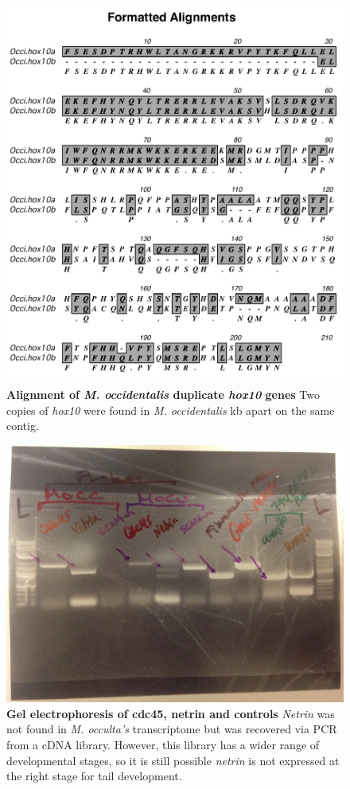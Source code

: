 \begin{figure}[tbp]
\centering
\includegraphics[scale=0.95]{figures/Occi_hox10.pdf}
\caption{\textbf{Alignment of \textit{M. occidentalis} duplicate \textit{hox10} genes} Two copies of \textit{hox10} were found in \textit{M. occidentalis}  kb apart on the same contig.}
\label{fig:occihox10}
\end{figure}

\begin{figure}[tbp]
\centering
\includegraphics[scale=0.10]{figures/gel.jpg}
\caption{\textbf{Gel electrophoresis of cdc45, netrin and controls} \textit{Netrin} was not found in \textit{M. occulta's} transcriptome but was recovered via PCR from a cDNA library. However, this library has a wider range of developmental stages, so it is still possible \textit{netrin} is not expressed at the right stage for tail development.}
\label{fig:gel}
\end{figure}


